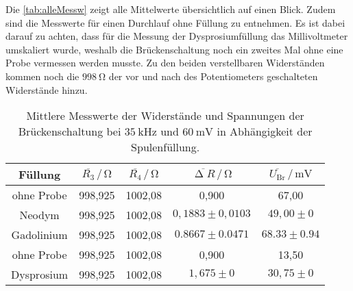 \noindent
Die \autoref{tab:alleMessw} zeigt alle Mittelwerte übersichtlich auf einen Blick. Zudem sind die Messwerte für einen Durchlauf ohne Füllung zu entnehmen.
Es ist dabei darauf zu achten, dass für die Messung der Dysprosiumfüllung das Millivoltmeter umskaliert wurde, weshalb die Brückenschaltung noch ein zweites Mal ohne eine Probe vermessen werden musste.
Zu den beiden verstellbaren Widerständen kommen noch die $\SI{998}{\ohm}$ der vor und nach des Potentiometers geschalteten Widerstände hinzu.
\begin{table}[H]
  \centering
  \caption{Mittlere Messwerte der Widerstände und Spannungen der Brückenschaltung bei $\SI{35}{\kilo\hertz}$ und $\SI{60}{\milli\volt}$ in Abhängigkeit der Spulenfüllung.}
  \label{tab:alleMessw}
  \begin{tabular}{c| c c c c}
    \toprule
    Füllung & $\overline{R_3} \,/\, \si{\ohm}$ & $\overline{R_4} \,/\, \si{\ohm}$ & $\overline{\upDelta R} \,/\, \si{\ohm}$ & $\overline{U_{\text{Br}}} \,/\, \si{\milli\volt}$ \\
    \midrule
    ohne Probe & 998,925 & 1002,08 & 0,900 & 67,00 \\
    Neodym & 998,925 & 1002,08 & $0,1883 \pm 0,0103$ & $49,00 \pm 0$\\ 
    Gadolinium & 998,925 & 1002,08 & $0.8667 \pm 0.0471$ & $68.33 \pm 0.94$\\ \hline
    ohne Probe & 998,925 & 1002,08 & 0,900 & 13,50 \\
    Dysprosium & 998,925 & 1002,08 & $1,675 \pm 0$ & $30,75 \pm 0$ \\
    \bottomrule
  \end{tabular}
\end{table}

